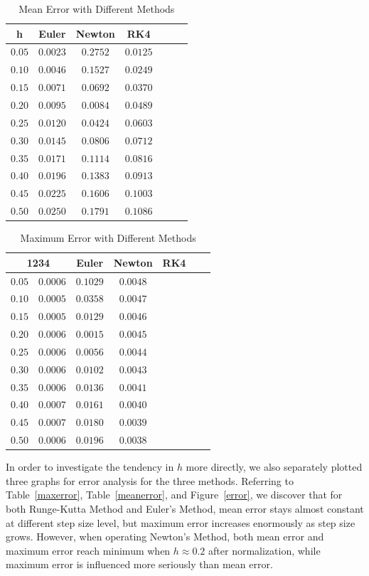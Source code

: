 \documentclass[
11pt, %
a4paper, %
oneside, %
headinclude,footinclude, %
BCOR5mm, %
]{scrartcl}
\begin{document}
\begin{table}[hbt]
\caption{Mean Error with Different Methods}
\centering
\begin{tabular}{ c c c c c c c }
\toprule
h & Euler & Newton & RK4 \\
\midrule
$0.05$ & $0.0023$ & $0.2752$ & $0.0125$ \\
$0.10$ & $0.0046$ & $0.1527$ & $0.0249$ \\
$0.15$ & $0.0071$ & $0.0692$ & $0.0370$ \\
$0.20$ & $0.0095$ & $0.0084$ & $0.0489$ \\
$0.25$ & $0.0120$ & $0.0424$ & $0.0603$ \\
$0.30$ & $0.0145$ & $0.0806$ & $0.0712$ \\
$0.35$ & $0.0171$ & $0.1114$ & $0.0816$ \\
$0.40$ & $0.0196$ & $0.1383$ & $0.0913$ \\
$0.45$ & $0.0225$ & $0.1606$ & $0.1003$ \\
$0.50$ & $0.0250$ & $0.1791$ & $0.1086$ \\
\bottomrule
\end{tabular}
\label{meanerror}
\end{table}
\begin{table}[hbt]
\caption{Maximum Error with Different Methods}
\centering
\begin{tabular}{ c c c c c c c }
\toprule
\multicolumn{2}{c|}{\multirow{2}{*}{1234}}
h & Euler & Newton & RK4 \\
\midrule
$0.05$ & $0.0006$ & $0.1029$ & $0.0048$ \\
$0.10$ & $0.0005$ & $0.0358$ & $0.0047$ \\
$0.15$ & $0.0005$ & $0.0129$ & $0.0046$ \\
$0.20$ & $0.0006$ & $0.0015$ & $0.0045$ \\
$0.25$ & $0.0006$ & $0.0056$ & $0.0044$ \\
$0.30$ & $0.0006$ & $0.0102$ & $0.0043$ \\
$0.35$ & $0.0006$ & $0.0136$ & $0.0041$ \\
$0.40$ & $0.0007$ & $0.0161$ & $0.0040$ \\
$0.45$ & $0.0007$ & $0.0180$ & $0.0039$ \\
$0.50$ & $0.0006$ & $0.0196$ & $0.0038$ \\
\bottomrule
\end{tabular}
\label{maxerror}
\end{table}
\vspace{0.6em} \noindent In order to investigate the tendency in $h$ more directly, we also separately plotted three graphs for error analysis for the three methods. Referring to Table~\vref{maxerror}, Table~\vref{meanerror}, and Figure~\vref{error}, we discover that for both Runge-Kutta Method and Euler's Method, mean error stays almost constant at different step size level, but maximum error increases enormously as step size grows. However, when operating Newton's Method, both mean error and maximum error reach minimum when $h \approx 0.2$ after normalization, while maximum error is influenced more seriously than mean error. 
\end{document}
